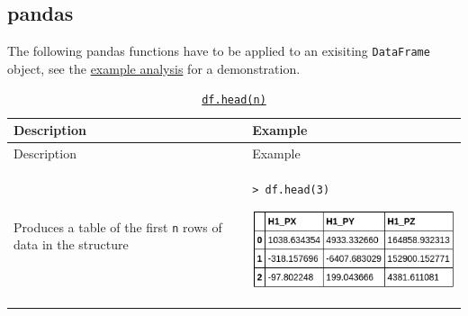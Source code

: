 \documentclass[10pt,a4paperpaper,]{article}
\begin{document}
\subsection{pandas}\label{pandas}

The following pandas functions have to be applied to an exisiting
\texttt{DataFrame} object, see the
\href{https://github.com/lhcb/opendata-project/blob/master/Example-Analysis.ipynb}{example
analysis} for a demonstration.

\begin{longtable}[]{@{}ll@{}}
\caption{\href{http://pandas.pydata.org/pandas-docs/stable/generated/pandas.DataFrame.head.html}{\texttt{df.head(n)}}}\tabularnewline
\toprule
\begin{minipage}[b]{0.47\columnwidth}\raggedright\strut
Description\strut
\end{minipage} & \begin{minipage}[b]{0.47\columnwidth}\raggedright\strut
Example\strut
\end{minipage}\tabularnewline
\midrule
\endfirsthead
\toprule
\begin{minipage}[b]{0.47\columnwidth}\raggedright\strut
Description\strut
\end{minipage} & \begin{minipage}[b]{0.47\columnwidth}\raggedright\strut
Example\strut
\end{minipage}\tabularnewline
\midrule
\endhead
\begin{minipage}[t]{0.47\columnwidth}\raggedright\strut
Produces a table of the first \texttt{n} rows of data in the
structure\strut
\end{minipage} & \begin{minipage}[t]{0.47\columnwidth}\raggedright\strut
\texttt{\textgreater{}\ df.head(3)}

\includegraphics[width=\textwidth]{assets/04-head.png}\strut
\end{minipage}\tabularnewline
\bottomrule
\end{longtable}
\end{document}
